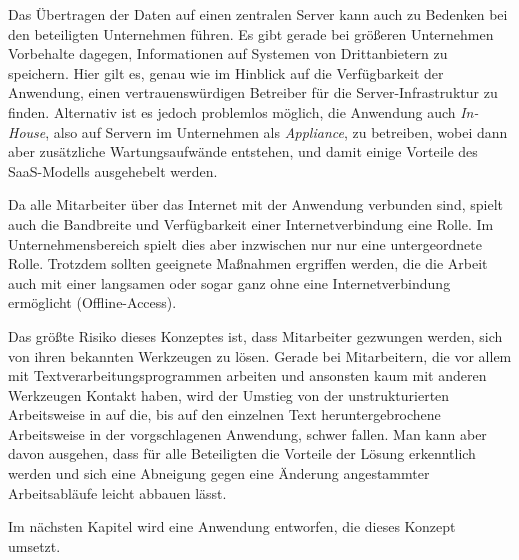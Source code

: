 Das Übertragen der Daten auf einen zentralen Server kann auch zu Bedenken bei den beteiligten Unternehmen führen. Es gibt gerade bei größeren Unternehmen Vorbehalte dagegen, Informationen auf Systemen von Drittanbietern zu speichern. Hier gilt es, genau wie im Hinblick auf die Verfügbarkeit der Anwendung, einen vertrauenswürdigen Betreiber für die Server-Infrastruktur zu finden. Alternativ ist es jedoch problemlos möglich, die Anwendung auch \emph{In-House}, also auf Servern im Unternehmen als \emph{Appliance}, zu betreiben, wobei dann aber zusätzliche Wartungsaufwände entstehen, und damit einige Vorteile des SaaS-Modells ausgehebelt werden. 

Da alle Mitarbeiter über das Internet mit der Anwendung verbunden sind, spielt auch die Bandbreite und Verfügbarkeit einer Internetverbindung eine Rolle. Im Unternehmensbereich spielt dies aber inzwischen nur nur eine untergeordnete Rolle. Trotzdem sollten geeignete Maßnahmen ergriffen werden, die die Arbeit auch mit einer langsamen oder sogar ganz ohne eine Internetverbindung ermöglicht (Offline-Access).

Das größte Risiko dieses Konzeptes ist, dass Mitarbeiter gezwungen werden, sich von ihren bekannten Werkzeugen zu lösen. Gerade bei Mitarbeitern, die vor allem mit Textverarbeitungsprogrammen arbeiten und ansonsten kaum mit anderen Werkzeugen Kontakt haben, wird der Umstieg von der unstrukturierten Arbeitsweise in  auf die, bis auf den einzelnen Text heruntergebrochene Arbeitsweise in der vorgschlagenen Anwendung, schwer fallen. Man kann aber davon ausgehen, dass für alle Beteiligten die Vorteile der Lösung erkenntlich werden und sich eine Abneigung gegen eine Änderung angestammter Arbeitsabläufe leicht abbauen lässt.

\secbar

Im nächsten Kapitel wird eine Anwendung entworfen, die dieses Konzept umsetzt.

\pagebreak